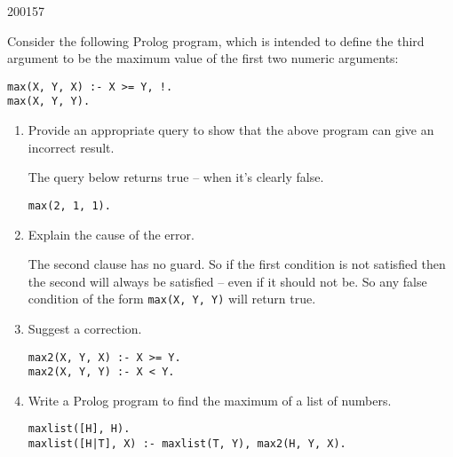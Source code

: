 \documentclass[10pt,\jkfside,a4paper]{article}
\begin{document}
\begin{examquestion}{2001}{5}{7}

Consider the following Prolog program, which is intended to define the
third argument to be the maximum value of the first two numeric arguments:
\begin{lstlisting}[style=pstyle]
max(X, Y, X) :- X >= Y, !.
max(X, Y, Y).
\end{lstlisting}

\begin{enumerate}

\item Provide an appropriate query to show that the above program can give an
incorrect result.

The query below returns true -- when it's clearly false.

\begin{lstlisting}[style=pstyle]
max(2, 1, 1).
\end{lstlisting}

\item Explain the cause of the error.

The second clause has no guard. So if the first condition is not satisfied
then the second will always be satisfied -- even if it should not be. So any
false condition of the form \texttt{max(X, Y, Y)} will return true.

\item Suggest a correction.

\begin{lstlisting}[style=pstyle]
max2(X, Y, X) :- X >= Y.
max2(X, Y, Y) :- X < Y.
\end{lstlisting}

\item Write a Prolog program to find the maximum of a list of numbers.

\begin{lstlisting}[style=pstyle]
maxlist([H], H).
maxlist([H|T], X) :- maxlist(T, Y), max2(H, Y, X).
\end{lstlisting}

\end{enumerate}

\end{examquestion}
\end{document}
